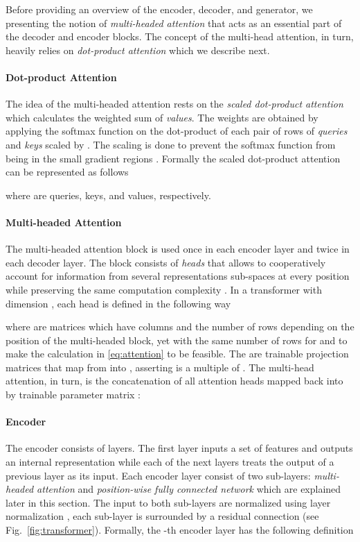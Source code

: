 \documentclass[10pt,twocolumn,letterpaper]{article}
\begin{document}
Before providing an overview of the encoder, decoder, and generator, we presenting the notion of \textit{multi-headed attention} that acts as an essential part of the decoder and encoder blocks. The concept of the multi-head attention, in turn, heavily relies on \textit{dot-product attention} which we describe next.

\paragraph{Dot-product Attention}
The idea of the multi-headed attention rests on the \textit{scaled dot-product attention} which calculates the weighted sum of \textit{values}. The weights are obtained by applying the softmax function on the dot-product of each pair of rows of \textit{queries} and \textit{keys} scaled by . The scaling is done to prevent the softmax function from being in the small gradient regions \cite{Vaswani2017}. Formally the scaled dot-product attention can be represented as follows

where  are queries, keys, and values, respectively.

\paragraph{Multi-headed Attention} 
The multi-headed attention block is used once in each encoder layer and twice in each decoder layer. The block consists of  \textit{heads} that allows to cooperatively account for information from several representations sub-spaces at every position while preserving the same computation complexity \cite{Vaswani2017}. In a transformer with dimension , each head is defined in the following way

where  are matrices which have  columns and the number of rows depending on the position of the multi-headed block, yet with the same number of rows for  and  to make the calculation in \eqref{eq:attention} to be feasible. The  are trainable projection matrices that map  from  into , asserting  is a multiple of .  The multi-head attention, in turn, is the concatenation of all attention heads mapped back into  by trainable parameter matrix :


\paragraph{Encoder} 
The encoder consists of  layers. The first layer inputs a set of features  and outputs an internal representation   while each of the next layers treats the output of a previous layer as its input. Each encoder layer  consist of two sub-layers: \textit{multi-headed attention} and \textit{position-wise fully connected network} which are explained later in this section. The input to both sub-layers are normalized using layer normalization \cite{Ba2016}, each sub-layer is surrounded by a residual connection \cite{He2016} (see Fig.~\ref{fig:transformer}). Formally, the -th encoder layer has the following definition
\end{document}
